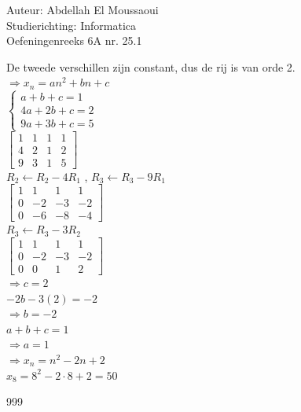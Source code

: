 \documentclass[a4paper]{article}
\begin{document}
  
\noindent \large Auteur: Abdellah El Moussaoui \\
\noindent \large Studierichting: Informatica\\
\noindent \large Oefeningenreeks 6A nr. 25.1\\

\medskip

\normalsize

De tweede verschillen zijn constant, dus de rij is van orde 2.\\

$\Rightarrow x_n=an^2+bn+c$\\

$\left\{
\begin{array}{l}
a+b+c=1\\
4a+2b+c=2\\
9a+3b+c=5
\end{array}
\right.$\\

$\left[
\begin{array}{ccc|c}
1&1&1&1\\
4&2&1&2\\
9&3&1&5
\end{array}
\right]$\\

$R_2 \leftarrow R_2-4R_1$ , $R_3 \leftarrow R_3-9R_1$\\

$\left[
\begin{array}{ccc|c}
1&1&1&1\\
0&-2&-3&-2\\
0&-6&-8&-4
\end{array}
\right]$\\

$R_3 \leftarrow R_3-3R_2$\\

$\left[
\begin{array}{ccc|c}
1&1&1&1\\
0&-2&-3&-2\\
0&0&1&2
\end{array}
\right]$\\

$\Rightarrow \boxed{c=2}$\\

$-2b-3(2)=-2$\\

$\Rightarrow \boxed{b=-2}$\\

$a+b+c=1$\\


$\Rightarrow \boxed{a=1}$\\

$\Rightarrow  \boxed{x_n=n^2-2n+2}$\\

$x_8=8^2-2\cdot8+2=50$\\

\begin{thebibliography}{999}
\end{thebibliography}
\end{document}
